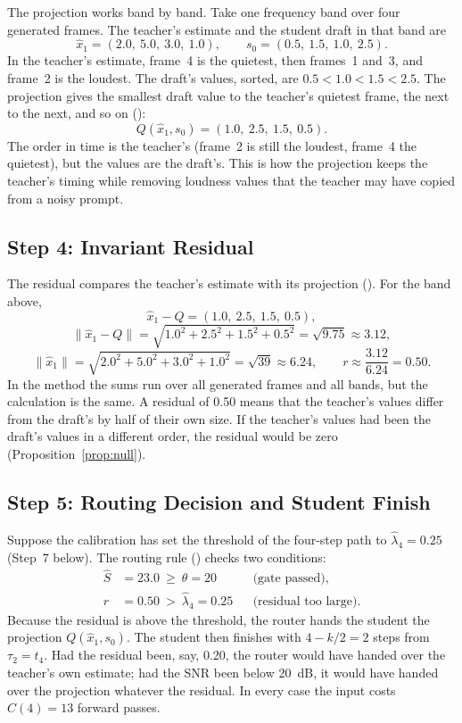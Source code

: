 The projection works band by band. Take one frequency band over four generated frames. The teacher's estimate and the student draft in that band are
\[
\hat x_1 = (2.0,\ 5.0,\ 3.0,\ 1.0), \qquad s_0 = (0.5,\ 1.5,\ 1.0,\ 2.5).
\]
In the teacher's estimate, frame~4 is the quietest, then frames~1 and~3, and frame~2 is the loudest. The draft's values, sorted, are $0.5<1.0<1.5<2.5$. The projection gives the smallest draft value to the teacher's quietest frame, the next to the next, and so on ():
\[
Q(\hat x_1,s_0) = (1.0,\ 2.5,\ 1.5,\ 0.5).
\]
The order in time is the teacher's (frame~2 is still the loudest, frame~4 the quietest), but the values are the draft's. This is how the projection keeps the teacher's timing while removing loudness values that the teacher may have copied from a noisy prompt.

\subsection{Step 4: Invariant Residual}
\label{app:calc-residual}

The residual compares the teacher's estimate with its projection (). For the band above,
\[
\hat x_1-Q = (1.0,\ 2.5,\ 1.5,\ 0.5),
\]
\[
\lVert\hat x_1-Q\rVert=\sqrt{1.0^2+2.5^2+1.5^2+0.5^2}=\sqrt{9.75}\approx3.12,
\]
\[
\lVert\hat x_1\rVert=\sqrt{2.0^2+5.0^2+3.0^2+1.0^2}=\sqrt{39}\approx6.24,\qquad r\approx\frac{3.12}{6.24}=0.50.
\]
In the method the sums run over all generated frames and all bands, but the calculation is the same. A residual of 0.50 means that the teacher's values differ from the draft's by half of their own size. If the teacher's values had been the draft's values in a different order, the residual would be zero (Proposition~\ref{prop:null}).

\subsection{Step 5: Routing Decision and Student Finish}
\label{app:calc-route}

Suppose the calibration has set the threshold of the four-step path to $\hat\lambda_4=0.25$ (Step~7 below). The routing rule () checks two conditions:
\[
\begin{aligned}
\hat S &= 23.0\ \ge\ \theta = 20 && \text{(gate passed)},\\
r &= 0.50\ >\ \hat\lambda_4 = 0.25 && \text{(residual too large)}.
\end{aligned}
\]
Because the residual is above the threshold, the router hands the student the projection $Q(\hat x_1,s_0)$. The student then finishes with $4-k/2=2$ steps from $\tau_2=t_4$. Had the residual been, say, 0.20, the router would have handed over the teacher's own estimate; had the SNR been below 20~dB, it would have handed over the projection whatever the residual. In every case the input costs $C(4)=13$ forward passes.

